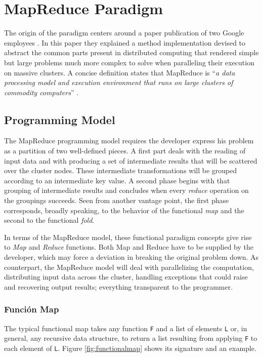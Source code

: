\section{MapReduce Paradigm}\label{sec:mapred}

\noindent The origin of the paradigm centers around a paper publication of two Google employees \cite{googlemapreduce}. In this paper they explained a method implementation devised to abstract the common parts present in distributed computing that rendered simple but large problems much more complex to solve when paralleling their execution on massive clusters. A concise definition states that MapReduce is ``\textit{a data processing model and execution environment that runs on large clusters of commodity computers}'' \cite{hadoopdefguide}.

\subsection{Programming Model}\label{subsec:programacionmapred}

\noindent The MapReduce programming model requires the developer express his problem as a partition of two well-defined pieces. A first part deals with the reading of input data and with producing a set of intermediate results that will be scattered over the cluster nodes. These intermediate transformations will be grouped according to an intermediate key value. A second phase begins with that grouping of intermediate results and concludes when every \emph{reduce} operation on the groupings succeeds. Seen from another vantage point, the first phase corresponds, broadly speaking, to the behavior of the functional \emph{map} and the second to the functional \emph{fold}.

In terms of the MapReduce model, these functional paradigm concepts give rise to \emph{Map} and \emph{Reduce} functions. Both Map and Reduce have to be supplied by the developer, which may force a deviation in breaking the original problem down. As counterpart, the MapReduce model will deal with parallelizing the computation, distributing input data across the cluster, handling exceptions that could raise and recovering output results; everything transparent to the programmer.

\subsubsection{Funci\'on Map}\label{map}

\noindent The typical functional map takes any function \texttt{F} and a list of elements \texttt{L} or, in general, any recursive data structure, to return a list resulting from applying \texttt{F} to each element of \texttt{L}. Figure \ref{fig:functionalmap} shows its signature and an example.

